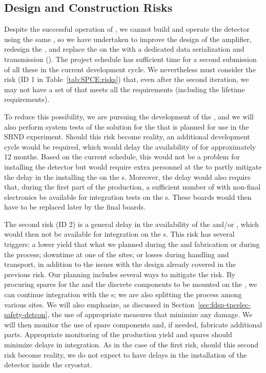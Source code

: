 \subsection{Design and Construction Risks}
\label{sec:fdsp-tpcelec-risks-design}

Despite the successful operation of , we cannot build and operate
the   detector using the same , so we have
undertaken to improve the design of the  amplifier, redesign
the , and replace the  on the  with a dedicated data
serialization and transmission  (). The project schedule has
sufficient time for a second submission of all these  in the current development cycle. We  nevertheless must consider the risk (ID 1
in Table~\ref{tab:SPCE:risks}) that, even after the second iteration, 
we may not have a set of  that meets all the  requirements
(including the lifetime requirements). 

To reduce this possibility, we are pursuing the development of the  , and we
will also perform system tests of the  solution for the  that is planned for use in the SBND experiment. Should this risk become reality, an
additional development cycle would be required, which would delay the availability
of  for approximately 12 months. Based on the current schedule, this would
not be a problem for installing the detector but would require extra 
personnel at the  to partly mitigate the delay in the
installing the  on the s. Moreover, the delay would also require
that, during the first part of the  production, a sufficient number
of  with non-final electronics be available for integration tests
on the s. These boards would then have to be replaced later
by the final boards.

The second risk (ID 2) is a general delay in the availability of the 
and/or , which would then not be available for integration
on the s. This risk has several triggers: a lower yield 
that what we planned during the  and  
fabrication or during the  process; downtime at one of the  sites; or losses during 
handling and transport, in addition to the issues with the design already 
covered in the previous risk. Our planning includes several ways to mitigate the risk. By procuring
spares for the  and the discrete components to be mounted on the
, we can continue integration with the s;
we are also splitting the  process among various sites. We will also emphasize,
as discussed in Section~\ref{sec:fdsp-tpcelec-safety-detcon}, the use of appropriate
measures that minimize any  damage. We will then monitor the use
of spare components and, if needed, fabricate additional parts. Appropriate
monitoring of the production yield and spares should minimize
delays in  integration. As in the case of the first risk, should this
second risk become reality, we do not expect to have delays in the installation of the 
detector inside the cryostat. 
 
